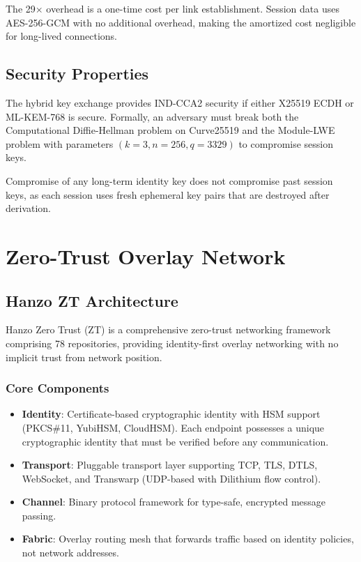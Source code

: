 \documentclass[11pt,letterpaper]{article}
\begin{document}
The 29$\times$ overhead is a one-time cost per link establishment. Session data uses AES-256-GCM with no additional overhead, making the amortized cost negligible for long-lived connections.

\subsection{Security Properties}

\begin{theorem}
The hybrid key exchange provides IND-CCA2 security if either X25519 ECDH or ML-KEM-768 is secure. Formally, an adversary must break both the Computational Diffie-Hellman problem on Curve25519 and the Module-LWE problem with parameters $(k=3, n=256, q=3329)$ to compromise session keys.
\end{theorem}

\begin{theorem}
Compromise of any long-term identity key does not compromise past session keys, as each session uses fresh ephemeral key pairs that are destroyed after derivation.
\end{theorem}

\section{Zero-Trust Overlay Network}

\subsection{Hanzo ZT Architecture}

Hanzo Zero Trust (ZT) is a comprehensive zero-trust networking framework comprising 78 repositories, providing identity-first overlay networking with no implicit trust from network position.

\subsubsection{Core Components}

\begin{itemize}
\item \textbf{Identity}: Certificate-based cryptographic identity with HSM support (PKCS\#11, YubiHSM, CloudHSM). Each endpoint possesses a unique cryptographic identity that must be verified before any communication.
\item \textbf{Transport}: Pluggable transport layer supporting TCP, TLS, DTLS, WebSocket, and Transwarp (UDP-based with Dilithium flow control).
\item \textbf{Channel}: Binary protocol framework for type-safe, encrypted message passing.
\item \textbf{Fabric}: Overlay routing mesh that forwards traffic based on identity policies, not network addresses.
\end{itemize}
\end{document}

